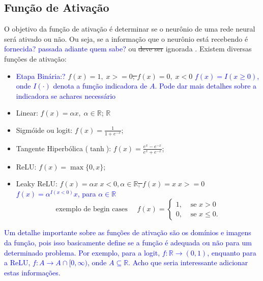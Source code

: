 \documentclass{automatextcc}
\newcommand{\pumi}[1]{\textcolor{blue}{#1}}
\newcommand{\R}{\mathds{R}}
\begin{document}
\subsection{Função de Ativação}
O objetivo da função de ativação é determinar se o neurônio de uma rede neural será ativado ou não. Ou seja, se a informação que o neurônio está recebendo é \pumi{fornecida? passada adiante quem sabe?} ou \sout{deve ser} ignorada \citep{dsa2021deeplearningbook}. Existem diversas funções de ativação:
\begin{itemize}
    \item \pumi{Etapa Binária:?} \sout{$f(x) = 1, \; x>=0$; $f(x) = 0, \; x<0$ } \pumi{$f(x)=I(x\geq 0)$, onde $I(\cdot)$ denota a função indicadora de $A$. Pode dar mais detalhes sobre a indicadora se achares necessário}
    \item Linear: $f(x) = \alpha x, \; \alpha \in\R$; \sout{$\mathbb{R}$}
    \item Sigmóide ou logit: $f(x) = \frac{1}{1+e^{-x}}$; 
    \item Tangente Hiperbólica ($\tanh$): $f(x) = \frac{e^{x}-e^{-x}}{e^{x}+e^{-x}}$;
    \item ReLU: $f(x) = \max\{0,x\}$;
    \item Leaky ReLU: \sout{$f(x) = \alpha x \; x<0, \alpha \in \mathbb{R}$; $f(x) = x \; x>=0$}\pumi{$f(x)=\alpha^{I(x<0)}x$, para $\alpha\in\R$}
    \[\mbox{exemplo de begin cases }\quad f(x)=\begin{cases}
    1, & \mbox{ se } x>0\\
    0, & \mbox{ se } x\leq 0.
    \end{cases}\]
\end{itemize}
\pumi{Um detalhe importante sobre as funções de ativação são os domínios e imagens da função, pois isso basicamente define se a função é adequada ou não para um determinado problema. Por exemplo, para a logit, $f:\R\rightarrow(0,1)$, enquanto para a ReLU, $f:A\rightarrow A\cap [0,\infty)$, onde $A\subseteq\R$. Acho que seria interessante adicionar estas informações.  }


\end{document}
